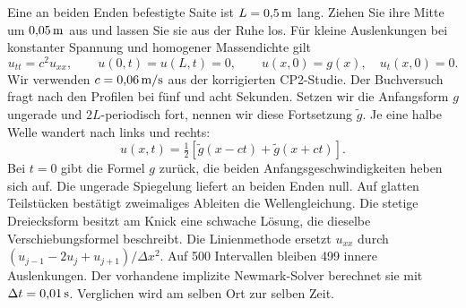 Eine an beiden Enden befestigte Saite ist \(L=0{,}5\,\mathrm{m}\) lang. Ziehen Sie ihre Mitte um \(0{,}05\,\mathrm{m}\) aus und lassen Sie sie aus der Ruhe los. Für kleine Auslenkungen bei konstanter Spannung und homogener Massendichte gilt
\[
 u_{tt}=c^2u_{xx},\qquad u(0,t)=u(L,t)=0,\qquad u(x,0)=g(x),\quad u_t(x,0)=0 .
\]
Wir verwenden \(c=0{,}06\,\mathrm{m/s}\) aus der korrigierten CP2-Studie. Der Buchversuch fragt nach den Profilen bei fünf und acht Sekunden.
Setzen wir die Anfangsform \(g\) ungerade und \(2L\)-periodisch fort, nennen wir diese Fortsetzung \(\tilde g\). Je eine halbe Welle wandert nach links und rechts:
\[
 u(x,t)=\tfrac12[\tilde g(x-ct)+\tilde g(x+ct)] .
\]
Bei \(t=0\) gibt die Formel \(g\) zurück, die beiden Anfangsgeschwindigkeiten heben sich auf. Die ungerade Spiegelung liefert an beiden Enden null. Auf glatten Teilstücken bestätigt zweimaliges Ableiten die Wellengleichung. Die stetige Dreiecksform besitzt am Knick eine schwache Lösung, die dieselbe Verschiebungsformel beschreibt.
Die Linienmethode ersetzt \(u_{xx}\) durch \((u_{j-1}-2u_j+u_{j+1})/\Delta x^2\). Auf 500 Intervallen bleiben 499 innere Auslenkungen. Der vorhandene implizite Newmark-Solver berechnet sie mit \(\Delta t=0{,}01\,\mathrm{s}\). Verglichen wird am selben Ort zur selben Zeit.

